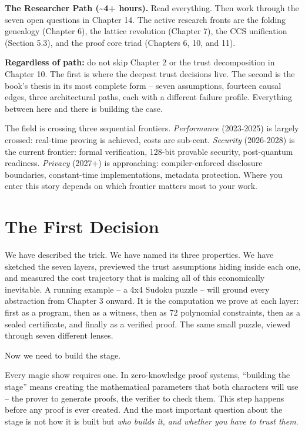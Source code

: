 \documentclass[
  11pt,
  openany]{report}
\renewcommand{\textbf}[1]{{\bfseries\color{MidnightBold}#1}}
\begin{document}
\textbf{The Researcher Path (\textasciitilde4+ hours).} Read everything. Then
work through the seven open questions in Chapter 14. The active research fronts
are the folding genealogy (Chapter 6), the lattice revolution (Chapter 7), the
CCS unification (Section 5.3), and the proof core triad (Chapters 6, 10, and
11).

\textbf{Regardless of path:} do not skip Chapter 2 or the trust decomposition in
Chapter 10. The first is where the deepest trust decisions live. The second is
the book's thesis in its most complete form -- seven assumptions, fourteen
causal edges, three architectural paths, each with a different failure profile.
Everything between here and there is building the case.

The field is crossing three sequential frontiers. \emph{Performance} (2023-2025)
is largely crossed: real-time proving is achieved, costs are sub-cent.
\emph{Security} (2026-2028) is the current frontier: formal verification,
128-bit provable security, post-quantum readiness. \emph{Privacy} (2027+) is
approaching: compiler-enforced disclosure boundaries, constant-time
implementations, metadata protection. Where you enter this story depends on
which frontier matters most to your work.

\section{The First Decision}\label{the-first-decision}

We have described the trick. We have named its three properties. We have
sketched the seven layers, previewed the trust assumptions hiding inside each
one, and measured the cost trajectory that is making all of this economically
inevitable. A running example -- a 4x4 Sudoku puzzle -- will ground every
abstraction from Chapter 3 onward. It is the computation we prove at each layer:
first as a program, then as a witness, then as 72 polynomial constraints, then
as a sealed certificate, and finally as a verified proof. The same small puzzle,
viewed through seven different lenses.

Now we need to build the stage.

Every magic show requires one. In zero-knowledge proof systems, ``building the
stage'' means creating the mathematical parameters that both characters will use
-- the prover to generate proofs, the verifier to check them. This step happens
before any proof is ever created. And the most important question about the
stage is not how it is built but \emph{who builds it, and whether you have to
trust them}.
\end{document}
